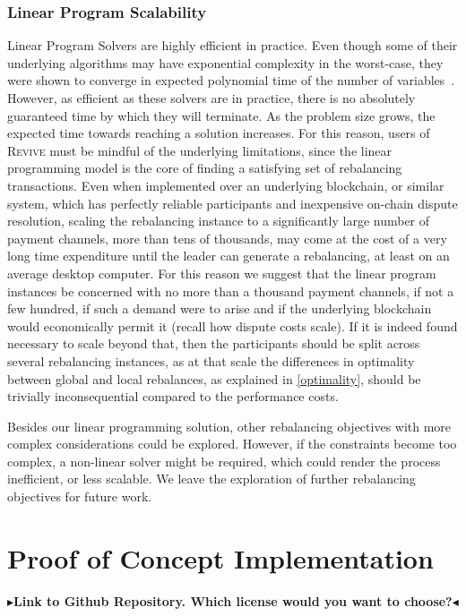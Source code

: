 \documentclass[sigconf]{acmart}
\newcommand{\name}{\textsc{Revive}\xspace}
\newcommand{\todo}[1]{{\bf \color{darkred}$\blacktriangleright$#1$\blacktriangleleft$}}
\begin{document}
\subsubsection{Linear Program Scalability}
Linear Program Solvers are highly efficient in practice. Even though some of their underlying algorithms may have exponential complexity in the worst-case, they were shown to converge in expected polynomial time of the number of variables~\cite{spielman2004smoothed}.
However, as efficient as these solvers are in practice, there is no absolutely guaranteed time by which they will terminate. As the problem size grows, the expected time towards reaching a solution increases. For this reason, users of \name must be mindful of the underlying limitations, since the linear programming model is the core of finding a satisfying set of rebalancing transactions.
Even when implemented over an underlying blockchain, or similar system, which has perfectly reliable participants and inexpensive on-chain dispute resolution, scaling the rebalancing instance to a significantly large number of payment channels, more than tens of thousands, may come at the cost of a very long time expenditure until the leader can generate a rebalancing, at least on an average desktop computer.
For this reason we suggest that the linear program instances be concerned with no more than a thousand payment channels, if not a few hundred, if such a demand were to arise and if the underlying blockchain would economically permit it (recall how dispute costs scale). If it is indeed found necessary to scale beyond that, then the participants should be split across several rebalancing instances, as at that scale the differences in optimality between global and local rebalances, as explained in \ref{optimality}, should be trivially inconsequential compared to the performance costs.

Besides our linear programming solution, other rebalancing objectives with more complex considerations could be explored. However, if the constraints become too complex, a non-linear solver might be required, which could render the process inefficient, or less scalable. We leave the exploration of further rebalancing objectives for future work.

\section{Proof of Concept Implementation}
\label{impl}
\todo{Link to Github Repository. Which license would you want to choose?}
\end{document}
